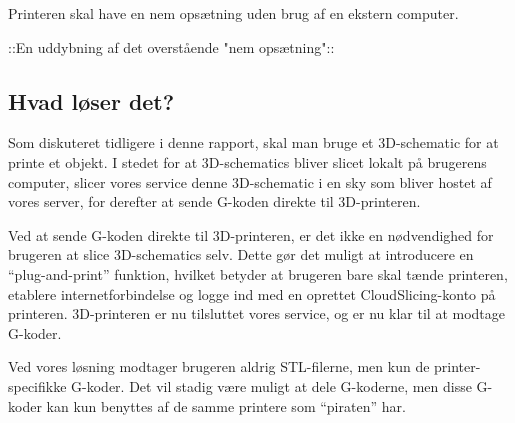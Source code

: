 Printeren skal have en nem opsætning uden brug af en ekstern computer.

::En uddybning af det overstående "nem opsætning"::

\subsection{Hvad løser det?} %
\label{sub:hvad_l_ser_det_}

Som diskuteret tidligere i denne rapport, skal man bruge et 3D-schematic for at printe et objekt. I stedet for at 3D-schematics bliver slicet lokalt på brugerens computer, slicer vores service denne 3D-schematic i en sky som bliver hostet af vores server, for derefter at sende G-koden direkte til 3D-printeren. 

Ved at sende G-koden direkte til 3D-printeren, er det ikke en nødvendighed for brugeren at slice 3D-schematics selv. Dette gør det muligt at introducere en ``plug-and-print'' funktion, hvilket betyder at brugeren bare skal tænde printeren, etablere internetforbindelse og logge ind med en oprettet CloudSlicing-konto på printeren. 3D-printeren er nu tilsluttet vores service, og er nu klar til at modtage G-koder.

Ved vores løsning modtager brugeren aldrig STL-filerne, men kun de printer-specifikke G-koder. Det vil stadig være muligt at dele G-koderne, men disse G-koder kan kun benyttes af de samme printere som ``piraten'' har.





